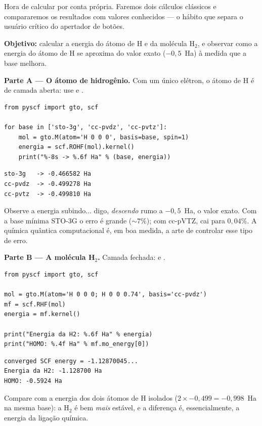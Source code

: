 Hora de calcular por conta própria. Faremos dois cálculos clássicos e
compararemos os resultados com valores conhecidos --- o hábito que separa o
usuário crítico do apertador de botões.

\begin{caixamaos}
\textbf{Objetivo:} calcular a energia do átomo de H e da molécula H$_2$, e
observar como a energia do átomo de H se aproxima do valor exato ($-0{,}5$~Ha)
à medida que a base melhora.

\vspace{0.4cm}
\textbf{Parte A --- O átomo de hidrogênio.} Com um único elétron, o átomo de H é
de camada aberta: use  e .

\begin{lstlisting}[style=python]
from pyscf import gto, scf

for base in ['sto-3g', 'cc-pvdz', 'cc-pvtz']:
    mol = gto.M(atom='H 0 0 0', basis=base, spin=1)
    energia = scf.ROHF(mol).kernel()
    print("%-8s -> %.6f Ha" % (base, energia))
\end{lstlisting}

\begin{lstlisting}[style=console]
sto-3g   -> -0.466582 Ha
cc-pvdz  -> -0.499278 Ha
cc-pvtz  -> -0.499810 Ha
\end{lstlisting}

Observe a energia subindo... digo, \emph{descendo} rumo a $-0{,}5$~Ha, o valor
exato. Com a base mínima STO-3G o erro é grande ($\sim 7\%$); com cc-pVTZ, cai
para $0{,}04\%$. A química quântica computacional é, em boa medida, a arte de
controlar esse tipo de erro.

\vspace{0.4cm}
\textbf{Parte B --- A molécula H$_2$.} Camada fechada:  e .

\begin{lstlisting}[style=python]
from pyscf import gto, scf

mol = gto.M(atom='H 0 0 0; H 0 0 0.74', basis='cc-pvdz')
mf = scf.RHF(mol)
energia = mf.kernel()

print("Energia da H2: %.6f Ha" % energia)
print("HOMO: %.4f Ha" % mf.mo_energy[0])
\end{lstlisting}

\begin{lstlisting}[style=console]
converged SCF energy = -1.12870045...
Energia da H2: -1.128700 Ha
HOMO: -0.5924 Ha
\end{lstlisting}

Compare com a energia dos dois átomos de H isolados ($2 \times -0{,}499 =
-0{,}998$~Ha na mesma base): a H$_2$ é bem \emph{mais} estável, e a diferença é,
essencialmente, a energia da ligação química.
\end{caixamaos}

